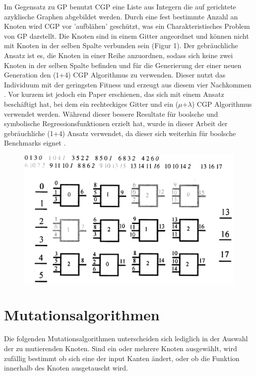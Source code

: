 Im Gegensatz zu GP benutzt CGP eine Liste aus Integern die auf gerichtete azyklische Graphen abgebildet werden. Durch eine fest bestimmte Anzahl an Knoten wird CGP vor 'aufblähen' geschützt, was ein Charakteristisches Problem von GP darstellt. Die Knoten sind in einem Gitter angeordnet und können nicht mit Knoten in der selben Spalte verbunden sein (Figur 1). Der gebräuchliche Ansatz ist es, die Knoten in einer Reihe anzuordnen, sodass sich keine zwei Knoten in der selben Spalte befinden und für die Generierung der einer neuen Generation den (1+4) CGP Algorithmus zu verwenden. Dieser nutzt das Individuum mit der geringsten Fitness und erzeugt aus diesem vier Nachkommen 
. 
Vor kurzem ist jedoch ein Paper erschienen, das sich mit einem Ansatz beschäftigt hat, bei dem ein rechteckiges Gitter und ein ($\mu$+$\lambda$) CGP Algorithmus verwendet werden. Während dieser bessere Resultate für boolsche und symbolische Regressionsfunktionen erzielt hat, wurde in dieser Arbeit der gebräuchliche (1+4) Ansatz verwendet, da dieser sich weiterhin für boolsche Benchmarks eignet 
.
\begin{figure}

\includegraphics[scale=0.3]{cgpExample}

\end{figure}

\section{Mutationsalgorithmen}

Die folgenden Mutationsalgorithmen unterscheiden sich lediglich in der Auswahl der zu mutierenden Knoten. Sind ein oder mehrere Knoten ausgewählt, wird zufällig bestimmt ob sich eine der input Kanten ändert, oder ob die Funktion innerhalb des Knoten ausgetauscht wird.



